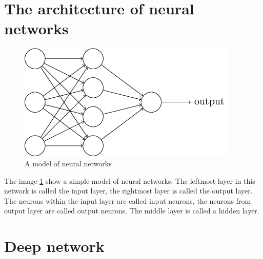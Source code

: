 \section{The architecture of neural networks}
\begin{figure}[h]
	\centering
	\includegraphics[scale=0.5]{images/neuron}
	\caption{A model of neural networks}
	\label{fignnnetworks}
\end{figure}
The image \ref{fignnnetworks} show a simple model of neural networks. The leftmost layer in this network is called the input layer, the rightmost layer is called the output layer. The neurons within the input layer are called input neurons, the neurons from output layer are called output neurons. The middle layer is called a hidden layer.
\section{Deep network}